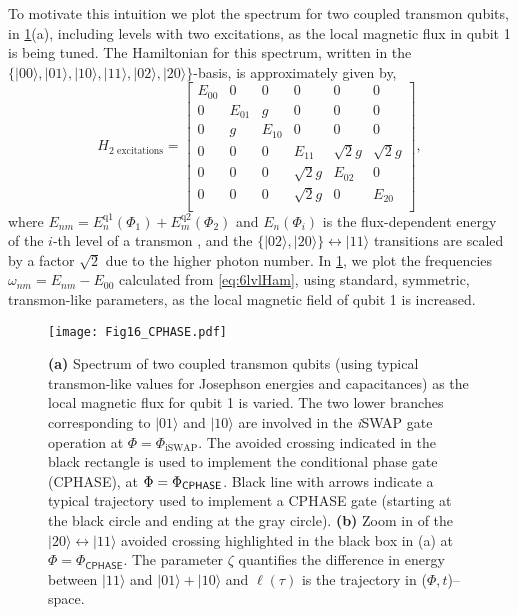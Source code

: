 \documentclass[aip,apr,twocolumn,showpacs,superscriptaddress,groupedaddress,nofootinbib,reprint]{revtex4-1}  %
\newcommand{\iSWAP}{\emph{i}\textsf{SWAP}}
\newcommand{\CPHASE}{\textsf{CPHASE}}
\begin{document}
To motivate this intuition we plot the spectrum for two coupled transmon qubits, in \cref{fig:2qb_CPHASE}(a), including levels with two excitations, as the local magnetic flux in qubit 1 is being tuned. The Hamiltonian for this spectrum, written in the  $\{|00\rangle, |01\rangle, |10\rangle, |11\rangle, |02\rangle, |20\rangle \}$-basis, is approximately given by,
\begin{equation}
H_\text{2 excitations} = \begin{bmatrix}
E_{00} & 0 & 0 & 0 & 0 & 0 \\
0 & E_{01} & g & 0 & 0 & 0 \\
0 & g & E_{10} & 0 & 0 & 0 \\
0 & 0 & 0 & E_{11} & \sqrt{2}g & \sqrt{2}g \\
0 & 0 & 0 & \sqrt{2}g & E_{02} & 0 \\
0 & 0 & 0 & \sqrt{2}g & 0 & E_{20} \\
\end{bmatrix}, \label{eq:6lvlHam}
\end{equation}
where $E_{nm} = E^\text{q1}_n(\Phi_1) + E^\text{q2}_m(\Phi_2)$ and $E_n(\Phi_i)$ is the flux-dependent energy of the $i$-th level of a transmon \cite{Koch2007}, and the $\{|02\rangle,|20\rangle\} \leftrightarrow |11\rangle$ transitions are scaled by a factor $\sqrt{2}$ due to the higher photon number. In \cref{fig:2qb_CPHASE}, we plot the frequencies $\omega_{nm} = E_{nm} - E_{00}$ calculated from \cref{eq:6lvlHam}, using standard, symmetric, transmon-like parameters, as the local magnetic field of qubit 1 is increased.
\begin{figure}[!t]
\begin{center}
\texttt{[image: Fig16\_CPHASE.pdf]}
\caption{\textbf{(a)} Spectrum of two coupled transmon qubits (using typical transmon-like values for Josephson energies and capacitances) as the local magnetic flux for qubit 1 is varied. The two lower branches corresponding to $|01\rangle$ and $|10\rangle$ are involved in the \iSWAP{} gate operation at $\Phi = \Phi_\text{iSWAP}$. The avoided crossing indicated in the black rectangle is used to implement the conditional phase gate (\CPHASE{}), at $\Phi = \Phi_\text{\CPHASE{}}$. Black line with arrows indicate a typical trajectory used to implement a \CPHASE{} gate (starting at the black circle and ending at the gray circle). \textbf{(b)} Zoom in of the $|20\rangle \leftrightarrow |11\rangle$ avoided crossing highlighted in the black box in (a) at $\Phi = \Phi_{\CPHASE{}}$. The parameter $\zeta$ quantifies the difference in energy between $|11\rangle$ and $|01\rangle + |10\rangle$ and $\ell(\tau)$ is the trajectory in ($\Phi,t$)--space.}
\label{fig:2qb_CPHASE}
\end{center}
\end{figure}
\end{document}
